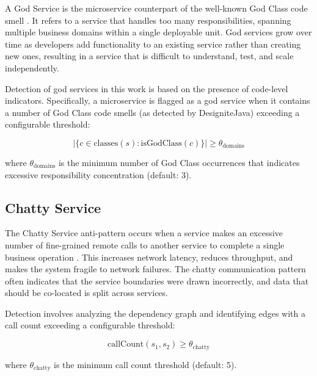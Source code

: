 \indent\par A God Service is the microservice counterpart of the well-known God Class code smell \cite{Fowler1999}. It refers to a service that handles too many responsibilities, spanning multiple business domains within a single deployable unit. God services grow over time as developers add functionality to an existing service rather than creating new ones, resulting in a service that is difficult to understand, test, and scale independently.

Detection of god services in this work is based on the presence of code-level indicators. Specifically, a microservice is flagged as a god service when it contains a number of God Class code smells (as detected by DesigniteJava) exceeding a configurable threshold:

\begin{equation}
    |\{c \in \text{classes}(s) : \text{isGodClass}(c)\}| \geq \theta_{\text{domains}}
    \label{eq:god-service}
\end{equation}

\noindent where $\theta_{\text{domains}}$ is the minimum number of God Class occurrences that indicates excessive responsibility concentration (default: 3).

\subsection{Chatty Service}
\label{subsec:chatty-service}

\indent\par The Chatty Service anti-pattern occurs when a service makes an excessive number of fine-grained remote calls to another service to complete a single business operation \cite{Richardson2018}. This increases network latency, reduces throughput, and makes the system fragile to network failures. The chatty communication pattern often indicates that the service boundaries were drawn incorrectly, and data that should be co-located is split across services.

Detection involves analyzing the dependency graph and identifying edges with a call count exceeding a configurable threshold:

\begin{equation}
    \text{callCount}(s_1, s_2) \geq \theta_{\text{chatty}}
    \label{eq:chatty-service}
\end{equation}

\noindent where $\theta_{\text{chatty}}$ is the minimum call count threshold (default: 5).

